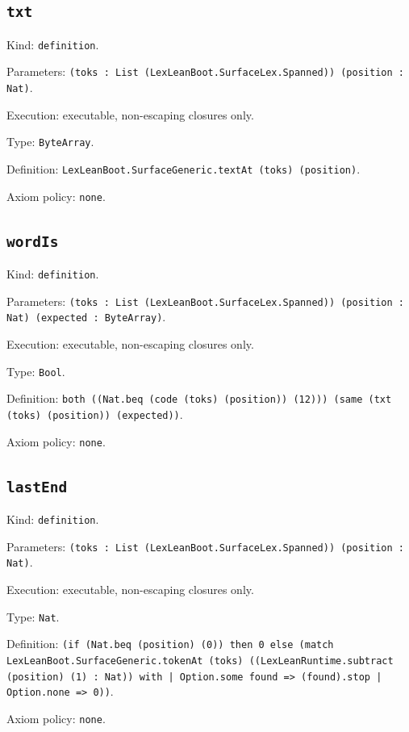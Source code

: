 \documentclass[11pt]{article}
\begin{document}
\subsection*{\texttt{txt}}
\noindent Kind: \texttt{definition}.\par
\noindent Parameters: \texttt{(toks : List (LexLeanBoot.SurfaceLex.Spanned)) (position : Nat)}.\par
\noindent Execution: executable, non-escaping closures only.\par
\noindent Type: \texttt{ByteArray}.\par
\noindent Definition: \texttt{LexLeanBoot.SurfaceGeneric.textAt (toks) (position)}.\par
\noindent Axiom policy: \texttt{none}.\par
\subsection*{\texttt{wordIs}}
\noindent Kind: \texttt{definition}.\par
\noindent Parameters: \texttt{(toks : List (LexLeanBoot.SurfaceLex.Spanned)) (position : Nat) (expected : ByteArray)}.\par
\noindent Execution: executable, non-escaping closures only.\par
\noindent Type: \texttt{Bool}.\par
\noindent Definition: \texttt{both ((Nat.beq (code (toks) (position)) (12))) (same (txt (toks) (position)) (expected))}.\par
\noindent Axiom policy: \texttt{none}.\par
\subsection*{\texttt{lastEnd}}
\noindent Kind: \texttt{definition}.\par
\noindent Parameters: \texttt{(toks : List (LexLeanBoot.SurfaceLex.Spanned)) (position : Nat)}.\par
\noindent Execution: executable, non-escaping closures only.\par
\noindent Type: \texttt{Nat}.\par
\noindent Definition: \texttt{(if (Nat.beq (position) (0)) then 0 else (match LexLeanBoot.SurfaceGeneric.tokenAt (toks) ((LexLeanRuntime.subtract (position) (1) : Nat)) with | Option.some found => (found).stop | Option.none => 0))}.\par
\noindent Axiom policy: \texttt{none}.\par
\end{document}
